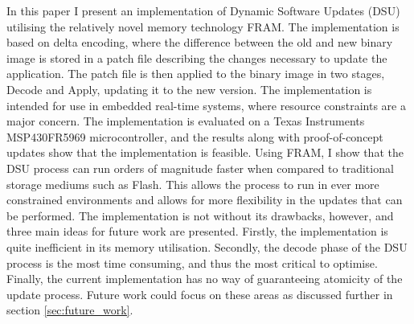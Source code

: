In this paper I present an implementation of Dynamic Software Updates (DSU) utilising the relatively novel memory technology FRAM. The implementation is based on delta encoding, where the difference between the old and new binary image is stored in a patch file describing the changes necessary to update the application. The patch file is then applied to the binary image in two stages, Decode and Apply, updating it to the new version. The implementation is intended for use in embedded real-time systems, where resource constraints are a major concern. The implementation is evaluated on a Texas Instruments MSP430FR5969 microcontroller, and the results along with proof-of-concept updates show that the implementation is feasible. Using FRAM, I show that the DSU process can run orders of magnitude faster when compared to traditional storage mediums such as Flash. This allows the process to run in ever more constrained environments and allows for more flexibility in the updates that can be performed. The implementation is not without its drawbacks, however, and three main ideas for future work are presented. Firstly, the implementation is quite inefficient in its memory utilisation. Secondly, the decode phase of the DSU process is the most time consuming, and thus the most critical to optimise. Finally, the current implementation has no way of guaranteeing atomicity of the update process. Future work could focus on these areas as discussed further in section \ref{sec:future_work}. 
